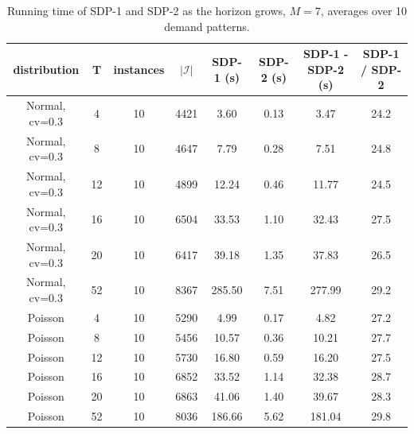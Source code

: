 \begin{table}[H]
\centering
\caption{Running time of SDP-1 and SDP-2 as the horizon grows, $M=7$, averages over 10 demand patterns.}
\label{tab:test1_Q3_horizon}
\begin{tabular}{cccccccc}
\toprule
distribution & T & instances & $|\mathcal{I}|$ & SDP-1 (s) & SDP-2 (s) & SDP-1 - SDP-2 (s) & SDP-1 / SDP-2 \\
\midrule
Normal, cv=0.3 & 4 & 10 & 4421 & 3.60 & 0.13 & 3.47 & 24.2 \\
Normal, cv=0.3 & 8 & 10 & 4647 & 7.79 & 0.28 & 7.51 & 24.8 \\
Normal, cv=0.3 & 12 & 10 & 4899 & 12.24 & 0.46 & 11.77 & 24.5 \\
Normal, cv=0.3 & 16 & 10 & 6504 & 33.53 & 1.10 & 32.43 & 27.5 \\
Normal, cv=0.3 & 20 & 10 & 6417 & 39.18 & 1.35 & 37.83 & 26.5 \\
Normal, cv=0.3 & 52 & 10 & 8367 & 285.50 & 7.51 & 277.99 & 29.2 \\
Poisson & 4 & 10 & 5290 & 4.99 & 0.17 & 4.82 & 27.2 \\
Poisson & 8 & 10 & 5456 & 10.57 & 0.36 & 10.21 & 27.7 \\
Poisson & 12 & 10 & 5730 & 16.80 & 0.59 & 16.20 & 27.5 \\
Poisson & 16 & 10 & 6852 & 33.52 & 1.14 & 32.38 & 28.7 \\
Poisson & 20 & 10 & 6863 & 41.06 & 1.40 & 39.67 & 28.3 \\
Poisson & 52 & 10 & 8036 & 186.66 & 5.62 & 181.04 & 29.8 \\
\bottomrule
\end{tabular}
\end{table}